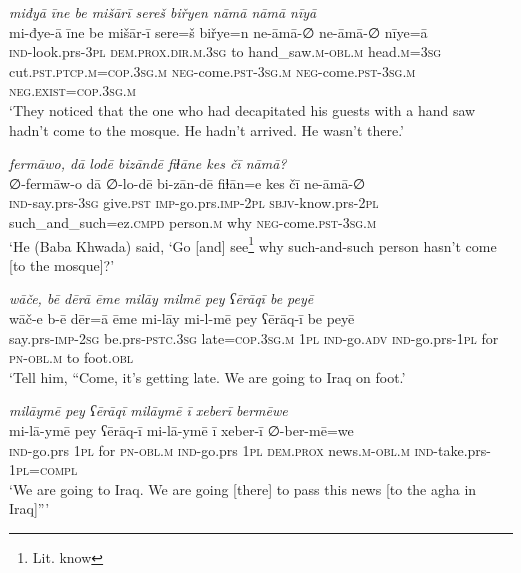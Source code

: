 \ea \label{BP.76}
\textit{miđyā īne be mišārī sereš biřyen nāmā nāmā nīyā} \\ 
\gll mi-đye-ā īne be mišār-ī sere=š biřye=n ne-āmā-∅ ne-āmā-∅ nīye=ā \\ 
 \textsc{ind-}look.prs\textsc{-3pl} \textsc{dem.prox}\textsc{.dir}\textsc{.m}\textsc{.3sg} to hand\_saw\textsc{.m}\textsc{-obl}\textsc{.m} head\textsc{.m}\textsc{=3sg} cut\textsc{.pst}\textsc{.ptcp}\textsc{.m}\textsc{=cop}\textsc{.3sg}\textsc{.m} \textsc{neg-}come\textsc{.pst}\textsc{-3sg}\textsc{.m} \textsc{neg-}come\textsc{.pst}\textsc{-3sg}\textsc{.m} \textsc{\textsc{neg.}exist}\textsc{=cop}\textsc{.3sg}\textsc{.m} \\ 
\glt `They noticed that the one who had decapitated his guests with a hand saw hadn’t come to the mosque. He hadn’t arrived. He wasn’t there.'
\z 
 
\ea \label{BP.77}
\textit{fermāwo, dā lodē bizāndē fiɫāne kes čī nāmā?} \\ 
\gll ∅-fermāw-o dā ∅-lo-dē bi-zān-dē fiɫān=e kes čī ne-āmā-∅ \\ 
 \textsc{ind-}say.prs\textsc{-3sg} give\textsc{.pst} \textsc{imp-}go.prs.\textsc{imp-}\textsc{2pl} \textsc{sbjv-}know.prs-\textsc{2pl} such\_and\_such=ez\textsc{.cmpd} person\textsc{.m} why \textsc{neg-}come\textsc{.pst}\textsc{-3sg}\textsc{.m} \\ 
\glt `He (Baba Khwada) said, ‘Go [and] see\footnote{Lit. know} why such-and-such person hasn’t come [to the mosque]?'
\z 
 
\ea \label{BP.78}
\textit{wāče, bē dērā ēme milāy milmē pey ʕērāqī be peyē} \\ 
\gll wāč-e b-ē dēr=ā ēme mi-lāy mi-l-mē pey ʕērāq-ī be peyē \\ 
 say.prs-\textsc{imp-}\textsc{2sg} be.prs\textsc{-pstc}\textsc{.3sg} late\textsc{=cop}\textsc{.3sg}\textsc{.m} \textsc{1pl} \textsc{ind-}go\textsc{.adv} \textsc{ind-}go.prs\textsc{-\textsc{1pl}} for \textsc{pn}\textsc{-obl}\textsc{.m} to foot\textsc{.obl} \\ 
\glt `Tell him, “Come, it’s getting late. We are going to Iraq on foot.'
\z 
 
\ea \label{BP.79}
\textit{milāymē pey ʕērāqī milāymē ī xeberī bermēwe} \\ 
\gll mi-lā-ymē pey ʕērāq-ī mi-lā-ymē ī xeber-ī ∅-ber-mē=we \\ 
 \textsc{ind-}go.prs \textsc{1pl} for \textsc{pn}\textsc{-obl}\textsc{.m} \textsc{ind-}go.prs \textsc{1pl} \textsc{dem.prox} news\textsc{.m}\textsc{-obl}\textsc{.m} \textsc{ind-}take.prs\textsc{-\textsc{1pl}}\textsc{=compl} \\ 
\glt `We are going to Iraq. We are going [there] to pass this news [to the agha in Iraq]”'
\z 
 

